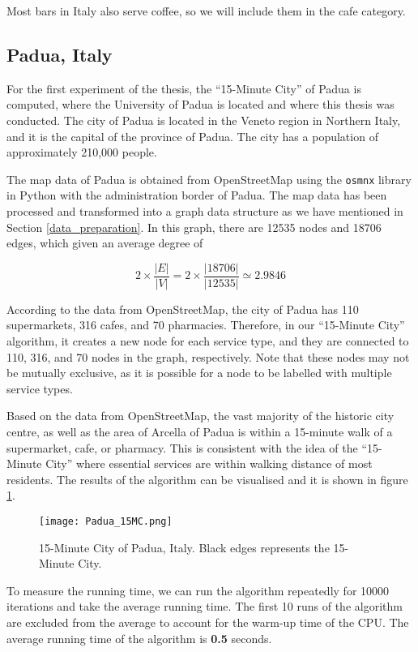 Most bars in Italy also serve coffee, so we will include them in the cafe category.

\subsection{Padua, Italy}

For the first experiment of the thesis, the ``15-Minute City'' of Padua is computed, where the University of Padua is located and where this thesis was conducted. The city of Padua is located in the Veneto region in Northern Italy, and it is the capital of the province of Padua. The city has a population of approximately 210,000 people.

The map data of Padua is obtained from OpenStreetMap using the \verb|osmnx| library in Python with the administration border of Padua. The map data has been processed and transformed into a graph data structure as we have mentioned in Section \ref{data_preparation}. In this graph, there are 12535 nodes and 18706 edges, which given an average degree of

$$2\times\frac{|E|}{|V|}=2\times\frac{|18706|}{|12535|}\simeq2.9846$$

According to the data from OpenStreetMap, the city of Padua has 110 supermarkets, 316 cafes, and 70 pharmacies. Therefore, in our ``15-Minute City'' algorithm, it creates a new node for each service type, and they are connected to 110, 316, and 70 nodes in the graph, respectively. Note that these nodes may not be mutually exclusive, as it is possible for a node to be labelled with multiple service types.

Based on the data from OpenStreetMap, the vast majority of the historic city centre, as well as the area of Arcella of Padua is within a 15-minute walk of a supermarket, cafe, or pharmacy. This is consistent with the idea of the ``15-Minute City'' where essential services are within walking distance of most residents. The results of the algorithm can be visualised and it is shown in figure \ref{fig:padua_15MC}.

\begin{figure}[htbp]
    \centering
    \texttt{[image: Padua\_15MC.png]}
    \caption{15-Minute City of Padua, Italy. Black edges represents the 15-Minute City.}
    \label{fig:padua_15MC}
\end{figure}


To measure the running time, we can run the algorithm repeatedly for 10000 iterations and take the average running time. The first 10 runs of the algorithm are excluded from the average to account for the warm-up time of the CPU. The average running time of the algorithm is \textbf{0.5} seconds.

